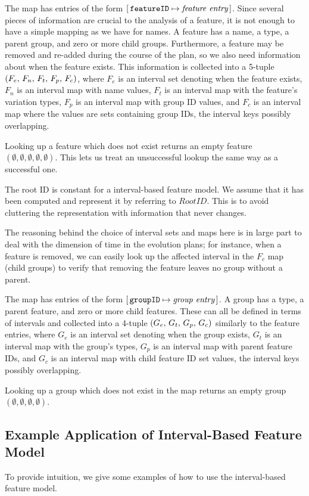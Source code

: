 The \features{} map has entries of the form $[ \,\texttt{featureID} \mapsto \textit{feature entry}\, ]$. Since several pieces of information are crucial to the analysis of a feature, it is not enough to have a simple mapping as we have for names.
A feature has a name, a type, a parent group, and zero or more child groups. Furthermore, a feature may be removed and re-added during the course of the plan, so we also need information about when the feature exists.
This information is collected into a 5-tuple $\left(F_e,\, F_n,\, F_t,\, F_p,\, F_c\right)$, where $F_e$ is an interval set denoting when the feature exists, $F_n$ is an interval map with name values, $F_t$ is an interval map with the feature's variation types, $F_p$ is an interval map with group ID values, and $F_c$ is an interval map where the values are sets containing group IDs, the interval keys possibly overlapping.

Looking up a feature which does not exist returns an empty feature $(\emptyset \comma \emptyset \comma \emptyset \comma \emptyset \comma \emptyset)$. This lets us treat an unsuccessful lookup the same way as a successful one.

The root ID is constant for a interval-based feature model. We assume that it has been computed and represent it by referring to $RootID$. This is to avoid cluttering the representation with information that never changes.

The reasoning behind the choice of interval sets and maps here is in large part to deal with the dimension of time in the evolution plans; for instance, when a feature is removed, we can easily look up the affected interval in the $F_c$ map (child groups) to verify that removing the feature leaves no group without a parent.

The \groups{} map has entries of the form $[ \,\texttt{groupID} \mapsto \textit{group entry}\, ]$. A group has a type, a parent feature, and zero or more child features. These can all be defined in terms of intervals and collected into a 4-tuple $\left(G_e,\, G_t,\, G_p,\, G_c\right)$ similarly to the feature entries, where $G_e$ is an interval set denoting when the group exists, $G_t$ is an interval map with the group's types, $G_p$ is an interval map with parent feature IDs, and $G_c$ is an interval map with child feature ID set values, the interval keys possibly overlapping.

Looking up a group which does not exist in the map returns an empty group $(\emptyset \comma \emptyset \comma \emptyset \comma \emptyset)$. 

\subsection{Example \textemdash{} Application of Interval-Based Feature Model}
\label{sec:how-to-use-the-interval-based-feature-model}
To provide intuition, we give some examples of how to use the interval-based feature model.

